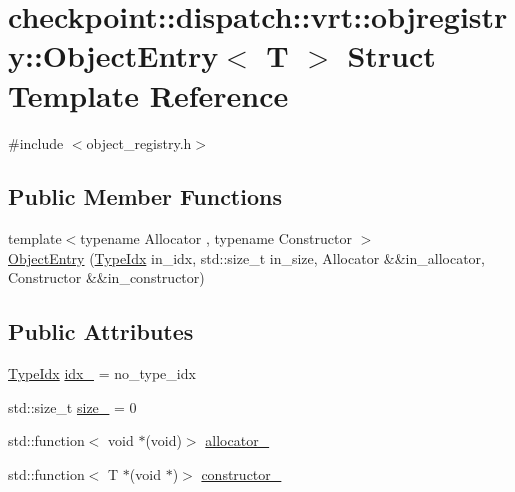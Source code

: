 \hypertarget{structcheckpoint_1_1dispatch_1_1vrt_1_1objregistry_1_1_object_entry}{}\section{checkpoint\+:\+:dispatch\+:\+:vrt\+:\+:objregistry\+:\+:Object\+Entry$<$ T $>$ Struct Template Reference}
\label{structcheckpoint_1_1dispatch_1_1vrt_1_1objregistry_1_1_object_entry}


{\ttfamily \#include $<$object\+\_\+registry.\+h$>$}

\subsection*{Public Member Functions}
\begin{DoxyCompactItemize}
\item 
{\footnotesize template$<$typename Allocator , typename Constructor $>$ }\\\hyperlink{structcheckpoint_1_1dispatch_1_1vrt_1_1objregistry_1_1_object_entry_a735350e927d76cbb9d0478fed399b0ca}{Object\+Entry} (\hyperlink{namespacecheckpoint_1_1dispatch_1_1vrt_acd3f9e6b091bcfbc23dc35ea8ef45d3b}{Type\+Idx} in\+\_\+idx, std\+::size\+\_\+t in\+\_\+size, Allocator \&\&in\+\_\+allocator, Constructor \&\&in\+\_\+constructor)
\end{DoxyCompactItemize}
\subsection*{Public Attributes}
\begin{DoxyCompactItemize}
\item 
\hyperlink{namespacecheckpoint_1_1dispatch_1_1vrt_acd3f9e6b091bcfbc23dc35ea8ef45d3b}{Type\+Idx} \hyperlink{structcheckpoint_1_1dispatch_1_1vrt_1_1objregistry_1_1_object_entry_a95864cbf2656db8f3d003f1d7d59ad0e}{idx\+\_\+} = no\+\_\+type\+\_\+idx
\item 
std\+::size\+\_\+t \hyperlink{structcheckpoint_1_1dispatch_1_1vrt_1_1objregistry_1_1_object_entry_a4395eb53a4569f96fde3dcf4e9b2ad02}{size\+\_\+} = 0
\item 
std\+::function$<$ void $\ast$(void)$>$ \hyperlink{structcheckpoint_1_1dispatch_1_1vrt_1_1objregistry_1_1_object_entry_a90e91c26c97dc9ea779e42e6c634d456}{allocator\+\_\+}
\item 
std\+::function$<$ T $\ast$(void $\ast$)$>$ \hyperlink{structcheckpoint_1_1dispatch_1_1vrt_1_1objregistry_1_1_object_entry_a2280096c968c25eec0f9d641ece38d23}{constructor\+\_\+}
\end{DoxyCompactItemize}


